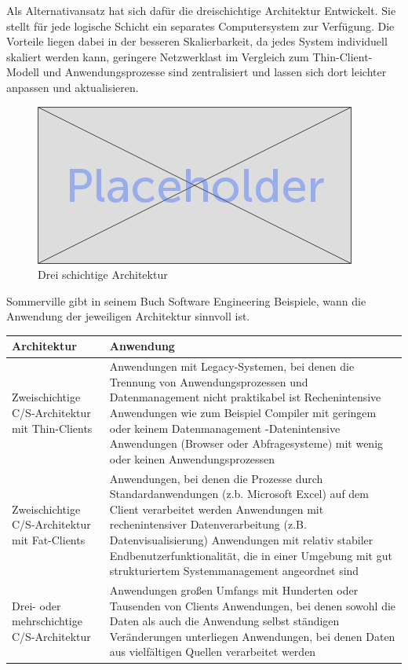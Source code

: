 	Als Alternativansatz hat sich dafür die dreischichtige Architektur Entwickelt. Sie stellt für jede logische Schicht ein separates Computersystem zur Verfügung. Die Vorteile liegen dabei in der besseren Skalierbarkeit, da jedes System individuell skaliert werden kann, geringere Netzwerklast im Vergleich zum Thin-Client-Modell und Anwendungsprozesse sind zentralisiert und lassen sich dort leichter anpassen und aktualisieren.
	

	\begin{figure}[h]
		\centering
		\includegraphics[width=0.7\linewidth]{images/placeholder}
		\caption{Drei schichtige Architektur}
		\label{fig:3-tier-architecture}
	\end{figure}


	Sommerville gibt in seinem Buch Software Engineering Beispiele, wann die Anwendung der jeweiligen Architektur sinnvoll ist.
	
	
	\begin{tabular}{|p{3.5cm}|p{12.5cm}|}
		\hline 
		Architektur & Anwendung \\ 
		\hline 
		Zweischichtige C/S-Architektur mit Thin-Clients & Anwendungen mit Legacy-Systemen, bei denen die Trennung von Anwendungsprozessen und Datenmanagement nicht praktikabel ist Rechenintensive Anwendungen wie zum Beispiel Compiler mit geringem oder keinem Datenmanagement -Datenintensive Anwendungen (Browser oder Abfragesysteme) mit wenig oder keinen Anwendungsprozessen \\
		\hline 
		Zweischichtige C/S-Architektur mit Fat-Clients & Anwendungen, bei denen die Prozesse durch Standardanwendungen (z.b. Microsoft Excel) auf dem Client verarbeitet werden Anwendungen mit rechenintensiver Datenverarbeitung (z.B. Datenvisualisierung) Anwendungen mit relativ stabiler Endbenutzerfunktionalität, die in einer Umgebung mit gut strukturiertem Systemmanagement angeordnet sind \\ 
		\hline 
		Drei- oder mehrschichtige C/S-Architektur & Anwendungen großen Umfangs mit Hunderten oder Tausenden von Clients Anwendungen, bei denen sowohl die Daten als auch die Anwendung selbst ständigen Veränderungen unterliegen Anwendungen, bei denen Daten aus vielfältigen Quellen verarbeitet werden \\ 
		\hline 
	\end{tabular} 
	
